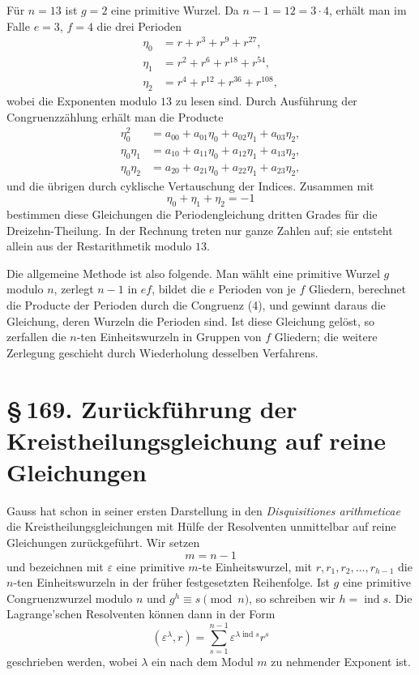 \documentclass[11pt]{article}
\providecommand{\sect}[2]{\section*{\S\,#1. #2}}
\providecommand{\ind}{\operatorname{ind}}
\begin{document}
Für $n=13$ ist $g=2$ eine primitive Wurzel. Da $n-1=12=3\cdot4$, erhält man im Falle $e=3$, $f=4$ die drei Perioden
\[
\begin{aligned}
        \eta_0&=r+r^3+r^9+r^{27},\\
        \eta_1&=r^2+r^6+r^{18}+r^{54},\\
        \eta_2&=r^4+r^{12}+r^{36}+r^{108},
\end{aligned}
\]
wobei die Exponenten modulo $13$ zu lesen sind. Durch Ausführung der Congruenzzählung erhält man die Producte
\[
\begin{aligned}
        \eta_0^2&=a_{00}+a_{01}\eta_0+a_{02}\eta_1+a_{03}\eta_2,\\
        \eta_0\eta_1&=a_{10}+a_{11}\eta_0+a_{12}\eta_1+a_{13}\eta_2,\\
        \eta_0\eta_2&=a_{20}+a_{21}\eta_0+a_{22}\eta_1+a_{23}\eta_2,
\end{aligned}                                                          \tag{5}
\]
und die übrigen durch cyklische Vertauschung der Indices. Zusammen mit
\[
        \eta_0+
        \eta_1+
        \eta_2=-1                                                       \tag{6}
\]
bestimmen diese Gleichungen die Periodengleichung dritten Grades für die Dreizehn-Theilung. In der Rechnung treten nur ganze Zahlen auf; sie entsteht allein aus der Restarithmetik modulo $13$.

Die allgemeine Methode ist also folgende. Man wählt eine primitive Wurzel $g$ modulo $n$, zerlegt $n-1$ in $ef$, bildet die $e$ Perioden von je $f$ Gliedern, berechnet die Producte der Perioden durch die Congruenz (4), und gewinnt daraus die Gleichung, deren Wurzeln die Perioden sind. Ist diese Gleichung gelöst, so zerfallen die $n$-ten Einheitswurzeln in Gruppen von $f$ Gliedern; die weitere Zerlegung geschieht durch Wiederholung desselben Verfahrens.

\sect{169}{Zurückführung der Kreistheilungsgleichung auf reine Gleichungen}

Gauss hat schon in seiner ersten Darstellung in den \emph{Disquisitiones arithmeticae} die Kreistheilungsgleichungen mit Hülfe der Resolventen unmittelbar auf reine Gleichungen zurückgeführt. Wir setzen
\[
        m=n-1
\]
und bezeichnen mit $\varepsilon$ eine primitive $m$-te Einheitswurzel, mit $r,r_1,r_2,\ldots,r_{h-1}$ die $n$-ten Einheitswurzeln in der früher festgesetzten Reihenfolge. Ist $g$ eine primitive Congruenzwurzel modulo $n$ und $g^h\equiv s\pmod n$, so schreiben wir $h=\ind s$. Die Lagrange'schen Resolventen können dann in der Form
\[
        (\varepsilon^\lambda,r)=
        \sum_{s=1}^{n-1}\varepsilon^{\lambda\ind s}r^s                         \tag{1}
\]
geschrieben werden, wobei $\lambda$ ein nach dem Modul $m$ zu nehmender Exponent ist.
\end{document}
